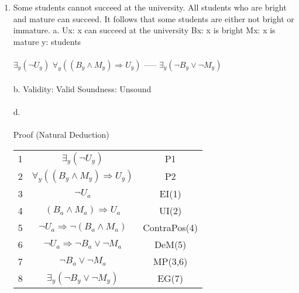 \documentclass[]{article}
\begin{document}
\begin{enumerate}
    \item Some students cannot succeed at the university. All students who are bright and mature can succeed. It follows that some students are either not bright or immature.
    \newline a.
    \newline Ux: x can succeed at the university
    \newline Bx: x is bright
    \newline Mx: x is mature
     \newline y: students 
    \\\\ $\exists_y (\neg U_y)$
    \newline $\forall_y ((B_y \land M_y)\Rightarrow U_y)$
    \newline -----
    \newline $\exists_y(\neg B_y \lor \neg M_y)$
    \\\\b.
    \newline Validity: Valid
    \newline Soundness: Unsound
    \\\\d.
    \\\\ Proof (Natural Deduction)
    \begin{tabular}{c| c | c}
        1 & $\exists_y (\neg U_y)$ & P1 \\
        2 & $\forall_y ((B_y \land M_y)\Rightarrow U_y)$ & P2 \\
        3 & $\neg U_a$ & EI(1) \\
        4 & $(B_a \land M_a)\Rightarrow U_a$ & UI(2) \\
        5 & $\neg U_a \Rightarrow \neg(B_a \land M_a)$ & ContraPos(4) \\
        6 & $\neg U_a \Rightarrow \neg B_a \lor \neg M_a$ & DeM(5) \\
        7 & $\neg B_a \lor \neg M_a$ & MP(3,6) \\
        8 & $\exists_y(\neg B_y \lor \neg M_y)$ & EG(7) \\
    \end{tabular}
    

\end{enumerate}
\end{document}
